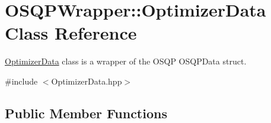 \section{O\+S\+Q\+P\+Wrapper\+:\+:Optimizer\+Data Class Reference}
\label{classOSQPWrapper_1_1OptimizerData}


\hyperlink{classOSQPWrapper_1_1OptimizerData}{Optimizer\+Data} class is a wrapper of the O\+S\+QP O\+S\+Q\+P\+Data struct.  




{\ttfamily \#include $<$Optimizer\+Data.\+hpp$>$}

\subsection*{Public Member Functions}
